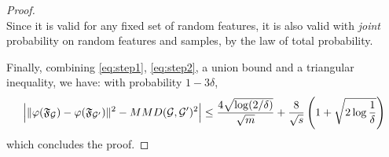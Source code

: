 \begin{proof}
\begin{equation}
\end{equation}
Since it is valid for any fixed set of random features, it is also valid with \emph{joint} probability on random features and samples, by the law of total probability.

Finally, combining \eqref{eq:step1}, \eqref{eq:step2}, a union bound and a triangular inequality, we have: with probability $1-3\delta$,
\begin{equation}
\Big|\|\varphi(\mathfrak{F}_{\mathcal{G}}) - \varphi(\mathfrak{F}_{\mathcal{G}'})\|^2 - MMD(\mathcal{G},\mathcal{G}')^2 \Big| \leq \frac{4 \sqrt{\log (2/\delta)}}{\sqrt{m}} + \frac{8}{\sqrt{{s}}}\left(1+\sqrt{2\log\frac{1}{\delta}}\right)
\end{equation}
which concludes the proof.

\end{proof}


